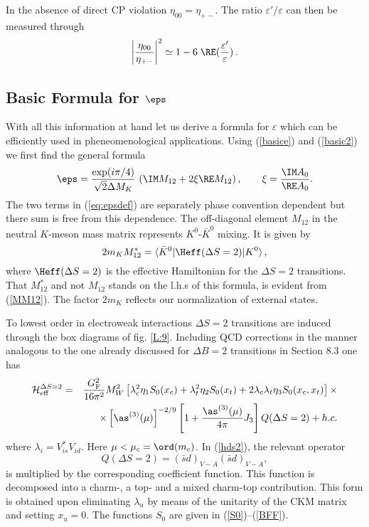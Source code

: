 In the absence of direct CP violation $\eta_{00}=\eta_{+-}$.
The ratio ${\varepsilon'}/{\varepsilon}$  can then be measured through
\begin{equation}
\left|{{\eta_{00}}\over{\eta_{+-}}}\right|^2\simeq 1 -6\; 
\RE(\frac{\varepsilon'}{\varepsilon})\,.
\end{equation}
\subsection{Basic Formula for $\eps$}
            \label{subsec:epsformula}
With all this information at hand let us derive a formula for $\varepsilon$
which can be efficiently used in pheneomenological applications.
Using (\ref{basice}) and (\ref{basic2}) we
first find the general formula 
\begin{equation}
\eps = \frac{\exp(i \pi/4)}{\sqrt{2} \Delta M_K} \,
\left( \IM M_{12} + 2 \xi \RE M_{12} \right),
\quad\quad
\xi = \frac{\IM A_0}{\RE A_0}.
\label{eq:epsdef}
\end{equation}
The two terms in (\ref{eq:epsdef}) are separately phase convention
dependent but there sum is free from this dependence.
The off-diagonal 
element $M_{12}$ in
the neutral $K$-meson mass matrix represents $K^0$-$\bar K^0$
mixing. It is given by
\begin{equation}
2 m_K M^*_{12} = \langle \bar K^0| \Heff(\Delta S=2) |K^0\rangle\,,
\label{eq:M12Kdef}
\end{equation}
where $\Heff(\Delta S=2)$ is the effective Hamiltonian for the 
$\Delta S=2$ transitions.
That $ M^*_{12}$ and not $ M_{12}$ stands on the l.h.s of this formula,
is evident from (\ref{MM12}). The factor $2 m_K$ reflects our normalization
of external states.

To lowest order in electroweak interactions $\Delta S=2$ transitions 
are induced
through the box diagrams of fig. \ref{L:9}. Including
 QCD corrections in the manner analogous to the one already discussed for
$\Delta B=2 $ transitions in Section 8.3 one has \cite{BJW90}
\begin{eqnarray}\label{hds2}
{\cal H}^{\Delta S=2}_{\rm eff}&=&\frac{G^2_{\rm F}}{16\pi^2}M^2_W
 \left[\lambda^2_c\eta_1 S_0(x_c)+\lambda^2_t \eta_2 S_0(x_t)+
 2\lambda_c\lambda_t \eta_3 S_0(x_c, x_t)\right] \times
\nonumber\\
& & \times \left[\as^{(3)}(\mu)\right]^{-2/9}\left[
  1 + \frac{\as^{(3)}(\mu)}{4\pi} J_3\right]  Q(\Delta S=2) + h. c.
\end{eqnarray}
where
$\lambda_i = V_{is}^* V_{id}^{}$. Here
$\mu<\mu_c=\ord(m_c)$.
In (\ref{hds2}),
the relevant operator
\begin{equation}\label{qsdsd}
Q(\Delta S=2)=(\bar sd)_{V-A}(\bar sd)_{V-A},
\end{equation}
is multiplied by the corresponding coefficient function.
This function is decomposed into a
charm-, a top- and a mixed charm-top contribution.
This form is obtained upon eliminating $\lambda_u$
by means of the unitarity of the CKM matrix and setting $x_u=0$. 
The functions $S_0$  are given in (\ref{S0})--(\ref{BFF}).

